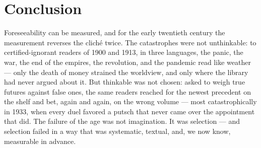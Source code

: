 \documentclass[11pt]{article}
\begin{document}
\section{Conclusion}\label{sec:conclusion}

Foreseeability can be measured, and for the early twentieth century the measurement reverses the cliché
twice. The catastrophes were not unthinkable: to certified-ignorant readers of 1900 and 1913, in three
languages, the panic, the war, the end of the empires, the revolution, and the pandemic read like weather ---
only the death of money strained the worldview, and only where the library had never argued about it. But
thinkable was not chosen: asked to weigh true futures against false ones, the same readers reached for the
newest precedent on the shelf and bet, again and again, on the wrong volume --- most catastrophically in
1933, when every duel favored a putsch that never came over the appointment that did. The failure of the age
was not imagination. It was selection --- and selection failed in a way that was systematic, textual, and,
we now know, measurable in advance.
\end{document}
